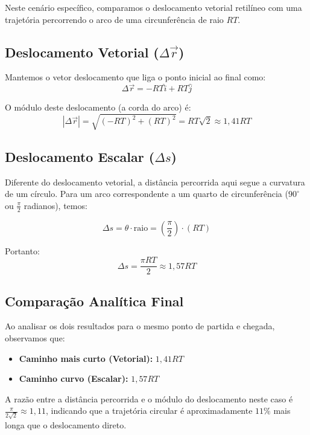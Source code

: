 \documentclass[11pt,a4paper]{article}
\begin{document}
Neste cenário específico, comparamos o deslocamento vetorial retilíneo com uma trajetória percorrendo o arco de uma circunferência de raio $R T$.

\subsection{Deslocamento Vetorial ($\Delta \vec{r}$)}
Mantemos o vetor deslocamento que liga o ponto inicial ao final como:
\begin{equation}
\Delta \vec{r} = -R T \hat{i} + R T \hat{j}
\end{equation}

O módulo deste deslocamento (a corda do arco) é:
\begin{equation}
|\Delta \vec{r}| = \sqrt{(-RT)^2 + (RT)^2} = RT\sqrt{2} \approx 1,41 RT
\end{equation}

\subsection{Deslocamento Escalar ($\Delta s$)}
Diferente do deslocamento vetorial, a distância percorrida aqui segue a curvatura de um círculo. Para um arco correspondente a um quarto de circunferência ($90^\circ$ ou $\frac{\pi}{2}$ radianos), temos:

\begin{equation}
\Delta s = \theta \cdot \text{raio} = \left( \frac{\pi}{2} \right) \cdot (RT)
\end{equation}

Portanto:
\begin{equation}
\Delta s = \frac{\pi R T}{2} \approx 1,57 RT
\end{equation}

\subsection{Comparação Analítica Final}
Ao analisar os dois resultados para o mesmo ponto de partida e chegada, observamos que:
\begin{itemize}
    \item \textbf{Caminho mais curto (Vetorial):} $1,41 RT$
    \item \textbf{Caminho curvo (Escalar):} $1,57 RT$
\end{itemize}

A razão entre a distância percorrida e o módulo do deslocamento neste caso é $\frac{\pi}{2\sqrt{2}} \approx 1,11$, indicando que a trajetória circular é aproximadamente $11\%$ mais longa que o deslocamento direto.
\end{document}
